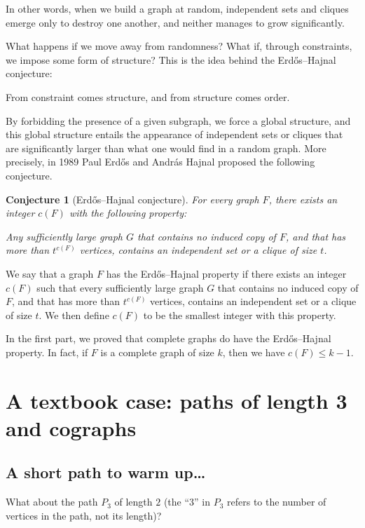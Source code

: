 \documentclass{amsart}
\newtheorem*{conjecture}{Conjecture}
\begin{document}
In other words, when we build a graph at random, independent sets and
cliques emerge only to destroy one another, and neither manages to
grow significantly.

What happens if we move away from randomness? What if, through
constraints, we impose some form of structure? This is the idea behind
the Erd\H os–Hajnal conjecture:

\bigskip\par
\begin{quoting}\sf\noindent
From constraint comes structure, and from structure comes order.
\end{quoting}
\bigskip\par

By forbidding the presence of a given subgraph, we force a
global structure, and this global structure entails the appearance of
independent sets or cliques that are significantly larger than what
one would find in a random graph. More precisely, in 1989 Paul Erd\H os
and Andr\'as Hajnal proposed the following conjecture.

\begin{conjecture}[Erd\H os–Hajnal conjecture]
  For every graph $F$, there exists an integer $c(F)$ with the
  following property:
  \medskip\par\noindent
  Any sufficiently large graph $G$ that contains no induced copy of
  $F$, and that has more than $t^{c(F)}$ vertices, contains an
  independent set or a clique of size $t$.
\end{conjecture}

We say that a graph $F$ has the Erd\H os–Hajnal property if there exists
an integer $c(F)$ such that every sufficiently large graph $G$ that
contains no induced copy of $F$, and that has more than $t^{c(F)}$
vertices, contains an independent set or a clique of size $t$. We then
define $c(F)$ to be the smallest integer with this property.

In the first part, we proved that complete graphs do have the Erd\H os–Hajnal
property. In fact, if $F$ is a complete graph of size $k$, then we have
$c(F)\leq k-1$.

\section{A textbook case: paths of length 3 and cographs}
\subsection{A short path to warm up\dots}
What about the path $P_{3}$ of length $2$ (the ``$3$'' in $P_{3}$
refers to the number of vertices in the path, not its length)?
\end{document}
